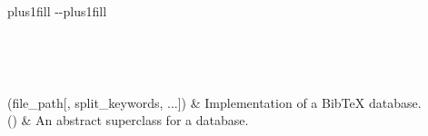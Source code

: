 \documentclass[letterpaper,10pt,english]{sphinxmanual}
\begin{document}
\begin{savenotes}
\sphinxatlongtablestart
\sphinxthistablewithglobalstyle
\sphinxthistablewithnovlinesstyle
\makeatletter
  \LTleft \@totalleftmargin plus1fill
  \LTright\dimexpr\columnwidth-\@totalleftmargin-\linewidth\relax plus1fill
\makeatother
\begin{longtable}{}
\sphinxtoprule
\endfirsthead

\\
\sphinxtoprule
\endhead

\sphinxbottomrule
{}\\
\endfoot

\endlastfoot
\sphinxtableatstartofbodyhook

\sphinxAtStartPar
{\hyperref[\detokenize{generated/bp_text.database:bp_text.database.BibTexDatabase}]{}}(file\_path{[}, split\_keywords, ...{]})
&
\sphinxAtStartPar
Implementation of a BibTeX database.
\\
\sphinxhline
\sphinxAtStartPar
{\hyperref[\detokenize{generated/bp_text.database:bp_text.database.Database}]{}}()
&
\sphinxAtStartPar
An abstract superclass for a database.
\\
\sphinxbottomrule
\end{longtable}
\sphinxtableafterendhook
\sphinxatlongtableend
\end{savenotes}
\end{document}
